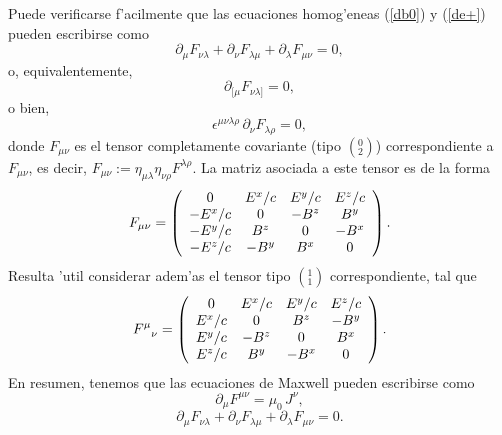 Puede verificarse f'acilmente que las ecuaciones homog'eneas (\ref{db0}) y (\ref{de+}) pueden escribirse como
\begin{equation}
\partial_\mu F_{\nu\lambda}+\partial_\nu F_{\lambda\mu}+\partial_\lambda
F_{\mu\nu}=0,
\end{equation}
o, equivalentemente,
\begin{equation}
\partial_{[\mu}F_{\nu\lambda]}=0,
\end{equation}
o bien,
\begin{equation}
\epsilon^{\mu\nu\lambda\rho}\,\partial_{\nu}F_{\lambda\rho}=0,
\end{equation}
donde $F_{\mu\nu}$ es el tensor completamente covariante (tipo $(^0_2)$)
correspondiente a $F_{\mu\nu}$, es decir,
$F_{\mu\nu}:=\eta_{\mu\lambda}\eta_{\nu\rho}F^{\lambda\rho}$. La matriz asociada
a este tensor es de la forma
\begin{equation}
F_{\mu\nu}=\left(
\begin{array}
[c]{cccc}
0 & E^x/c & E^y/c & E^z/c\\
-E^x/c & 0 & -B^z & B^y\\
-E^y/c & B^z & 0 & -B^x\\
-E^z/c & -B^y & B^x & 0
\end{array}
\right). \label{Fdndn}
\end{equation}
Resulta 'util considerar adem'as el tensor tipo $(^1_1)$ correspondiente, tal que
\begin{equation}
F^\mu_{\ \ \nu}=\left(
\begin{array}
[c]{cccc}
0 & E^x/c & E^y/c & E^z/c\\
E^x/c & 0 & B^z & -B^y\\
E^y/c & -B^z & 0 & B^x\\
E^z/c & B^y & -B^x & 0
\end{array}
\right). \label{Fupdn}
\end{equation}
En resumen, tenemos que las ecuaciones de Maxwell pueden escribirse como
\begin{equation}
\boxed{\partial_\mu  F^{\mu \nu} = \mu_0\, J^\nu,} \label{emihF}
\end{equation}
\begin{equation}
\boxed{\partial_\mu F_{\nu\lambda}+\partial_\nu F_{\lambda\mu}+\partial_\lambda
F_{\mu\nu}=0.} \label{homcov}
\end{equation}

